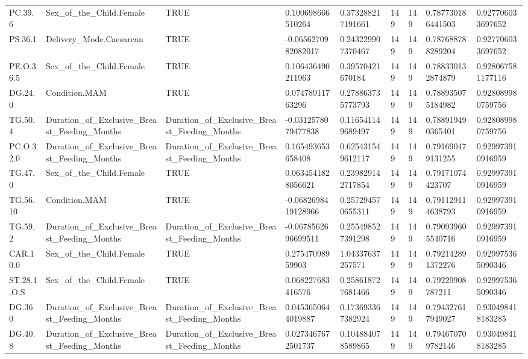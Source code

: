 \begin{longtable}{lllllllll}
PC.39.6 & Sex\_of\_the\_Child.Female & TRUE & 0.100698666510264 & 0.373288217191661 & 149 & 149 & 0.787730186441503 & 0.927706033697652 \\
PS.36.1 & Delivery\_Mode.Caesarean & TRUE & -0.0656270982082017 & 0.243229907370467 & 149 & 149 & 0.787688788289204 & 0.927706033697652 \\
PE.O.36.5 & Sex\_of\_the\_Child.Female & TRUE & 0.106436490211963 & 0.39570421670184 & 149 & 149 & 0.788330132874879 & 0.928067581177116 \\
DG.24.0 & Condition.MAM & TRUE & 0.07478911763296 & 0.278863735773793 & 149 & 149 & 0.788935075184982 & 0.928089980759756 \\
TG.50.4 & Duration\_of\_Exclusive\_Breast\_Feeding\_Months & Duration\_of\_Exclusive\_Breast\_Feeding\_Months & -0.0312578079477838 & 0.116541149689497 & 149 & 149 & 0.788919490365401 & 0.928089980759756 \\
PC.O.32.0 & Duration\_of\_Exclusive\_Breast\_Feeding\_Months & Duration\_of\_Exclusive\_Breast\_Feeding\_Months & 0.165493653658408 & 0.625431549612117 & 149 & 149 & 0.791690479131255 & 0.929973910916959 \\
TG.47.0 & Sex\_of\_the\_Child.Female & TRUE & 0.0634541828056621 & 0.239829142717854 & 149 & 149 & 0.79171074423707 & 0.929973910916959 \\
TG.56.10 & Condition.MAM & TRUE & -0.0682698419128966 & 0.257294570655311 & 149 & 149 & 0.791129114638793 & 0.929973910916959 \\
TG.59.2 & Duration\_of\_Exclusive\_Breast\_Feeding\_Months & Duration\_of\_Exclusive\_Breast\_Feeding\_Months & -0.0678562696699511 & 0.255498527391298 & 149 & 149 & 0.790939605540716 & 0.929973910916959 \\
CAR.10.0 & Sex\_of\_the\_Child.Female & TRUE & 0.27547098959903 & 1.04337637257571 & 149 & 149 & 0.792142891372276 & 0.929975365090346 \\
ST.28.1.O.S & Sex\_of\_the\_Child.Female & TRUE & 0.068227683416576 & 0.258618727681466 & 149 & 149 & 0.79229908787211 & 0.929975365090346 \\
DG.36.0 & Duration\_of\_Exclusive\_Breast\_Feeding\_Months & Duration\_of\_Exclusive\_Breast\_Feeding\_Months & 0.0453650644019887 & 0.173693367382924 & 149 & 149 & 0.794327617949027 & 0.930498418183285 \\
DG.40.8 & Duration\_of\_Exclusive\_Breast\_Feeding\_Months & Duration\_of\_Exclusive\_Breast\_Feeding\_Months & 0.0273467672501737 & 0.104884078589865 & 149 & 149 & 0.794670709782146 & 0.930498418183285 \\

\end{longtable}
